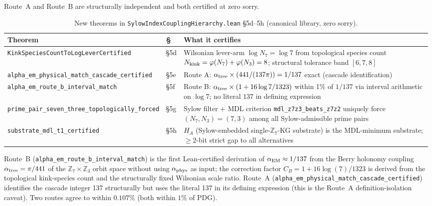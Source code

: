 \documentclass[11pt,a4paper]{article}
\newenvironment{keybox}[1]{%
  \Needspace*{8\baselineskip}%
  \begin{tcolorbox}[
    enhanced,
    breakable=false,
    colback=blue!5,
    colframe=blue!45!black,
    coltitle=black,
    colbacktitle=blue!14,
    boxrule=0.85pt,
    arc=2.5pt,
    left=9pt, right=9pt, top=6pt, bottom=6pt,
    titlerule=0.55pt,
    fonttitle=\bfseries,
    title={#1},
    before upper=\raggedright,
    before skip=0.9\baselineskip,
    after skip=0.9\baselineskip
  ]%
}{%
  \end{tcolorbox}%
}
\theoremstyle{definition}
\begin{document}
\begin{keybox}{Two independent Lean-certified derivations of $\alpha_{\rm EM} \approx 1/137$}
Route~A and Route~B are structurally independent and both certified at zero sorry.
\end{keybox}

\begin{table}[h]
\centering\small
\begin{tabular}{@{}p{4.5cm}p{1.2cm}p{9.3cm}@{}}
\toprule
Theorem & § & What it certifies \\
\midrule
\texttt{KinkSpecies\allowbreak CountToLog\allowbreak LeverCertified}   & §5d &
  Wilsonian lever-arm $\log N_7 = \log 7$ from topological species count
  $N_{\rm kink} = \varphi(N_7)+\varphi(N_3) = 8$;
  structural tolerance band $[6,7,8]$ \\[2pt]
\texttt{alpha\_em\_\allowbreak physical\_\allowbreak match\_\allowbreak cascade\_\allowbreak certified} & §5e &
  Route A: $\alpha_{\rm tree} \times (441 / (137\pi)) = 1/137$ exact
  (cascade identification) \\[2pt]
\texttt{alpha\_em\_\allowbreak route\_b\_\allowbreak interval\_match}  & §5f &
  Route B: $\alpha_{\rm tree} \times (1 + 16\log 7/1323)$ within 1\% of
  $1/137$ via interval arithmetic on $\log 7$;
  no literal $137$ in defining expression \\[2pt]
\texttt{prime\_pair\_\allowbreak seven\_three\_\allowbreak topologically\_\allowbreak forced} & §5g &
  Sylow filter + MDL criterion \lstinline|mdl_z7z3_beats_z7z2|
  uniquely force $(N_7, N_3) = (7,3)$ among all Sylow-admissible prime pairs \\[2pt]
\texttt{substrate\_\allowbreak mdl\_t1\_\allowbreak certified}         & §5h &
  $H_A$ (Sylow-embedded single-$\mathbb{Z}_7$-KG substrate) is the
  MDL-minimum substrate; $\ge 2$-bit strict gap to all alternatives \\
\bottomrule
\end{tabular}
\caption{New theorems in \texttt{SylowIndexCouplingHierarchy.lean} §5d–5h
  (canonical library, zero sorry).}
\label{tab:sylow-aem-sections}
\end{table}

Route~B (\lstinline|alpha_em_route_b_interval_match|) is the first
Lean-certified derivation of $\alpha_{\rm EM} \approx 1/137$ from the Berry
holonomy coupling $\alpha_{\rm tree} = \pi/441$ of the $\mathbb{Z}_7 \times \mathbb{Z}_3$
orbit space without using $\alpha_{\rm phys}$ as input; the correction factor
$C_B = 1 + 16\log(7)/1323$ is derived from the topological kink-species count
and the structurally fixed Wilsonian scale ratio.
Route~A (\lstinline|alpha_em_physical_match_cascade_certified|) identifies the
cascade integer 137 structurally but uses the literal 137 in its defining
expression (this is the Route~A definition-isolation caveat).
Two routes agree to within $0.107\%$ (both within $1\%$ of PDG).
\end{document}
